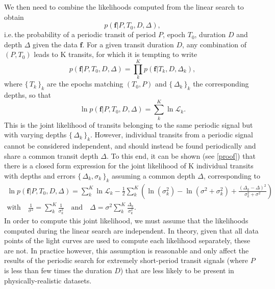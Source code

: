 \documentclass[modern]{aastex631}
\newcommand{\set}[1]{\{\,#1\,\}}
\begin{document}
We then need to combine the likelihoods computed from the linear search to obtain
\begin{equation*}
    p(\bm{f} \vert P, T_0 , D, \Delta),
\end{equation*}
i.e.\,the probability of a periodic transit of period $P$, epoch $T_0$, duration $D$ and depth $\Delta$ given the data $\bm{f}$. For a given transit duration $D$, any combination of $(P, T_0)$ leads to K transits, for which it is tempting to write
\begin{equation}\label{eq:attempt}
    p(\bm{f} \vert P, T_0 ,D, \Delta) = \prod_k^K p(\bm{f} \vert T_k, D, \Delta_k),
\end{equation}
where $\set{T_k}_k$ are the epochs matching $(T_0, P)$ and $\set{\Delta_k}_k$ the corresponding depths, so that
\begin{equation*}
    \ln p(\bm{f} \vert P, T_0 ,D, \Delta) = \sum_k^K \ln \mathcal{L}_k.
\end{equation*}
This is the joint likelihood of transits belonging to the same periodic signal but with varying depths  $\set{\Delta_k}_k$. However, individual transits from a periodic signal cannot be considered independent, and should instead be found periodically and share a common transit depth $\Delta$. To this end, it can be shown (see \autoref{proof}) that there is a closed form expression for the joint likelihood of K individual transits with depths and errors $\set{\Delta_k, \sigma_k}_k$ assuming a common depth $\Delta$, corresponding to 
\begin{equation}\label{eq:result}
    \begin{gathered}
        \ln p(\bm{f} \vert P, T_0 ,D, \Delta) =  \sum_{k}^K \ln \mathcal{L}_k  - \frac{1}{2} \sum_k^K\left(\ln(\sigma_{k}^2) - \ln(\sigma^{2} + \sigma_{k}^{2}) +  \frac{\left(\Delta_{k} -
        \Delta\right)^{2}}{\sigma_k^{2} + \sigma^{2}}\right) \\
        \text{with} \quad  \frac{1}{\sigma^2} = \sum_k^K \frac{1}{\sigma_k^2} \quad \text{and} \quad
        \Delta = \sigma^2 \sum_k^K {\frac{\Delta_k}{\sigma_k^2}}.
    \end{gathered}
\end{equation}
In order to compute this joint likelihood, we must assume that the likelihoods computed during the linear search are independent. In theory, given that all data points of the light curves are used to compute each likelihood separately, these are not. In practice however, this assumption is reasonable and only affect the results of the periodic search for extremely short-period transit signals (where $P$ is less than few times the duration $D$) that are less likely to be present in physically-realistic datasets.\\\\
\end{document}
